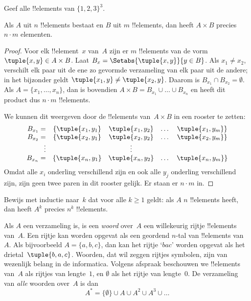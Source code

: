 \documentclass[openany]{memoir}
\begin{document}
\begin{prob}
Geef alle !!{element}s van $\{1, 2, 3\}^3$.
\end{prob}

\begin{prop}
Als $A$ uit $n$ !!{element}s bestaat en $B$ uit $m$ !!{element}s, dan
heeft $A \times B$ precies $n\cdot m$ elementen.
\end{prop}

\begin{proof}
Voor elk !!{element}~$x$ van~$A$ zijn er $m$ !!{element}s van de vorm
$\tuple{x, y} \in A \times B$. Laat $B_x = \Setabs{\tuple{x, y}}{y
  \in B}$. Als $x_1 \neq x_2$, verschilt elk paar uit de ene zo
gevormde verzameling van elk paar uit de andere; in het bijzonder geldt $\tuple{x_1, y} \neq
\tuple{x_2, y}$. Daarom is $B_{x_1} \cap B_{x_2} = \emptyset$. Als
$A = \{x_1, \dots, x_n\}$, dan is bovendien $A \times B = B_{x_1}
\cup \dots \cup B_{x_n}$ en heeft dit product dus $n\cdot m$
!!{element}s.

We kunnen dit weergeven door de !!{element}s van~$A \times B$ in een
rooster te zetten:
\[
\begin{array}{rcccc}
  B_{x_1} = & \{\tuple{x_1, y_1} & \tuple{x_1, y_2} & \dots & \tuple{x_1, y_m}\}\\
  B_{x_2} = & \{\tuple{x_2, y_1} & \tuple{x_2, y_2} & \dots & \tuple{x_2, y_m}\}\\
  \vdots & & \vdots\\
  B_{x_n} = & \{\tuple{x_n, y_1} & \tuple{x_n, y_2} & \dots & \tuple{x_n, y_m}\}
\end{array}
\]
Omdat alle $x_i$ onderling verschillend zijn en ook alle $y_j$
onderling verschillend zijn, zijn geen twee paren in dit rooster
gelijk. Er staan er $n\cdot m$ in.
\end{proof}

\begin{prob}
Bewijs met inductie naar~$k$ dat voor alle $k \ge 1$ geldt: als $A$
$n$ !!{element}s heeft, dan heeft $A^k$ precies $n^k$ !!{element}s.
\end{prob}

\begin{ex}
Als $A$ een verzameling is, is een \emph{woord} over~$A$ een
willekeurig rijtje !!{element}s van~$A$. Een rijtje kan worden opgevat
als een geordend $n$-tal van !!{element}s van~$A$. Als bijvoorbeeld $A =
\{a, b, c\}$, dan kan het rijtje ‘$bac$’ worden opgevat als het
drietal~$\tuple{b, a, c}$. Woorden, dat wil zeggen rijtjes symbolen,
zijn van wezenlijk belang in de informatica. Volgens afspraak
beschouwen we !!{element}s van~$A$ als rijtjes van lengte~$1$, en
$\emptyset$ als het rijtje van lengte~$0$. De verzameling van
\emph{alle} woorden over~$A$ is dan
\[
A^* = \{\emptyset\} \cup A \cup A^2 \cup A^3 \cup \dots
\]
\end{ex}
\endgroup
\end{document}
